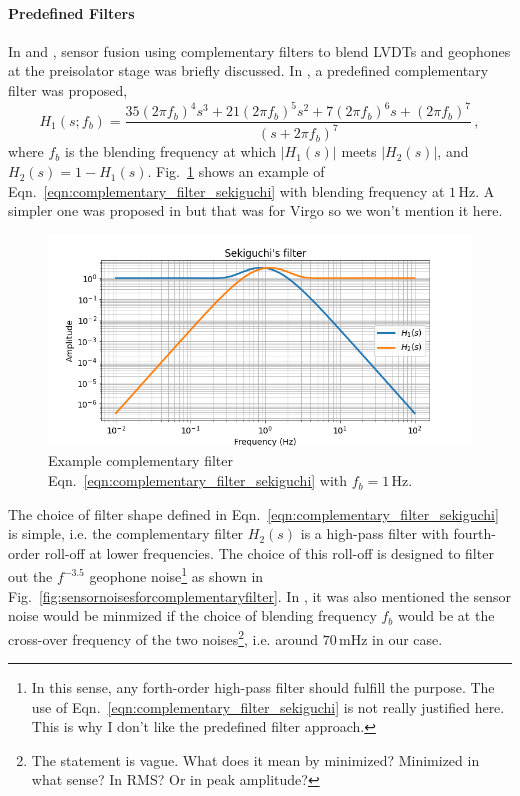\paragraph{Predefined Filters}
In \cite{Sekiguchi:2016bmv} and \cite{Heijningen:2018evm}, sensor fusion using complementary filters to blend LVDTs and geophones at the preisolator stage was briefly discussed.
In \cite{Sekiguchi:2016bmv}, a predefined complementary filter was proposed,
\begin{equation}
	H_1(s;f_b) = \frac{35(2\pi f_b)^4 s^3 + 21(2\pi f_b)^5 s^2 + 7(2\pi f_b)^6 s + (2\pi f_b)^7}{(s+2\pi f_b)^7}\,,
	\label{eqn:complementary_filter_sekiguchi}
\end{equation}
where $f_b$ is the blending frequency at which $\lvert H_1(s)\rvert$ meets $\lvert H_2(s) \rvert$, and $H_2(s)=1-H_1(s)$.
Fig.~\ref{fig:sekiguchicomplementaryfilter} shows an example of Eqn.~\eqref{eqn:complementary_filter_sekiguchi} with blending frequency at $1\,\mathrm{Hz}$.
A simpler one was proposed in \cite{Heijningen:2018evm} but that was for Virgo so we won't mention it here.
\begin{figure}[!h]
	\centering
	\includegraphics[width=0.7\linewidth]{figures/sekiguchi_complementary_filter}
	\caption{Example complementary filter Eqn.~\eqref{eqn:complementary_filter_sekiguchi} with $f_b=1\,\mathrm{Hz}$.}
	\label{fig:sekiguchicomplementaryfilter}
\end{figure}
The choice of filter shape defined in Eqn.~\eqref{eqn:complementary_filter_sekiguchi} is simple, i.e. the complementary filter $H_2(s)$ is a high-pass filter with fourth-order roll-off at lower frequencies.
The choice of this roll-off is designed to filter out the $f^{-3.5}$ geophone noise\footnote{In this sense, any forth-order high-pass filter should fulfill the purpose. The use of Eqn.~\eqref{eqn:complementary_filter_sekiguchi} is not really justified here. This is why I don't like the predefined filter approach.} as shown in Fig.~\ref{fig:sensornoisesforcomplementaryfilter}.
In \cite{Sekiguchi:2016bmv}, it was also mentioned the sensor noise would be minmized if the choice of blending frequency $f_b$ would be at the cross-over frequency of the two noises\footnote{The statement is vague. What does it mean by minimized? Minimized in what sense? In RMS? Or in peak amplitude?}, i.e. around $70\,\mathrm{mHz}$ in our case.

